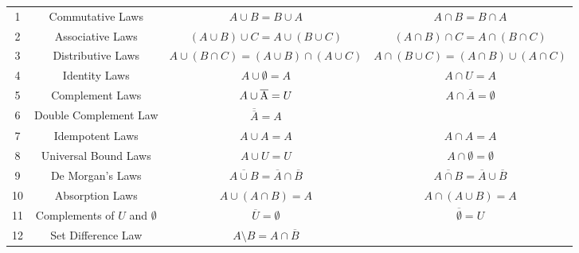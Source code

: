 \documentclass{article}
\begin{document}
\begin{description}
    \begin{table}[h]
        \centering
        {
        \begin{tabular}{|c|c|c|c|}
            \hline
             1 & Commutative Laws & $A \cup B = B\cup A$ & $A \cap B=B\cap A$ \\
             2 & Associative Laws & $(A\cup B)\cup C=A\cup(B\cup C)$ & $(A\cap B)\cap C=A\cap(B\cap C)$ \\
             3 & Distributive Laws & $A\cup (B\cap C)=(A\cup B) \cap (A\cup C)$ & $A\cap (B\cup C)=(A\cap B)\cup (A\cap C)$ \\ 
             4 & Identity Laws & $A\cup\emptyset = A$ & $A\cap U=A$ \\
             5 & Complement Laws & $A\cup \overline{\rm A}=U$ & $A\cap \overline{A} = \emptyset$ \\
             6 & Double Complement Law & $\overline{\overline{A}} = A$ &  \\
             7 & Idempotent Laws & $A\cup A = A$ & $A\cap A = A$ \\
             8 & Universal Bound Laws & $A\cup U=U$ & $A\cap \emptyset = \emptyset$ \\
             9 & De Morgan's Laws & $\overline{A\cup B} = \overline{A} \cap \overline{B}$ & $\overline{A\cap B} = \overline{A} \cup \overline{B}$ \\
             10 & Absorption Laws & $A\cup (A\cap B)=A$ & $A\cap(A\cup B)=A$ \\
             11 & Complements of $U$ and $\emptyset$ & $\overline{U} = \emptyset$ & $\overline{\emptyset} = U$ \\
             12 & Set Difference Law & $A\setminus B=A\cap \overline{B}$ & \\
            \hline
        \end{tabular}}
        \label{tab:1}
    \end{table}


\end{description}
\end{document}
